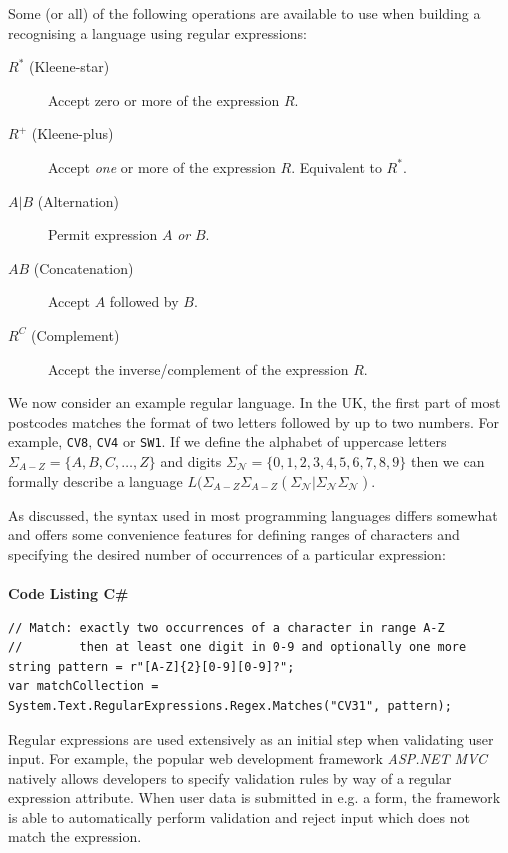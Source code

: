 \documentclass[a4paper,openany]{book}
\begin{document}
Some (or all) of the following operations are available to use when building a recognising a language using regular expressions:

\begin{description}
	\item[$R^*$ (Kleene-star)] Accept zero or more of the expression $R$.
	\item[$R^+$ (Kleene-plus)] Accept \emph{one} or more of the expression $R$. Equivalent to ${R^*}$.
	\item[$A \vert{} B$ (Alternation)] Permit expression $A$ \emph{or} $B$.
	\item[$AB$ (Concatenation)] Accept $A$ followed by $B$.
	\item[$R^C$ (Complement)] Accept the inverse/complement of the expression $R$.
\end{description}


We now consider an example regular language. In the UK, the first part of most postcodes matches the format of two letters followed by up to two numbers. For example, \texttt{CV8}, \texttt{CV4} or \texttt{SW1}. If we define the alphabet of uppercase letters $\Sigma_{A-Z} = \{A, B, C, \ldots, Z\}$ and digits $\Sigma_\mathcal{N} = \{0,1,2,3,4,5,6,7,8,9\}$ then we can formally describe a language $L(\Sigma_{A-Z} \Sigma_{A-Z}(\Sigma_\mathcal{N} | \Sigma_\mathcal{N} \Sigma_\mathcal{N})$.

As discussed, the syntax used in most programming languages differs somewhat and offers some convenience features for defining ranges of characters and specifying the desired number of occurrences of a particular expression:\\
\vspace{0.5em}\\
\sffamily \textcolor{id7-aubergine}{\textbf{ Code Listing \hfill C\#}}

\begin{verbatim}
// Match: exactly two occurrences of a character in range A-Z
//        then at least one digit in 0-9 and optionally one more
string pattern = r"[A-Z]{2}[0-9][0-9]?";
var matchCollection = System.Text.RegularExpressions.Regex.Matches("CV31", pattern);
\end{verbatim}

Regular expressions are used extensively as an initial step when validating user input. For example, the popular web development framework \emph{ASP.NET MVC} natively allows developers to specify validation rules by way of a regular expression attribute. When user data is submitted in e.g. a form, the framework is able to automatically perform validation and reject input which does not match the expression.
\end{document}
